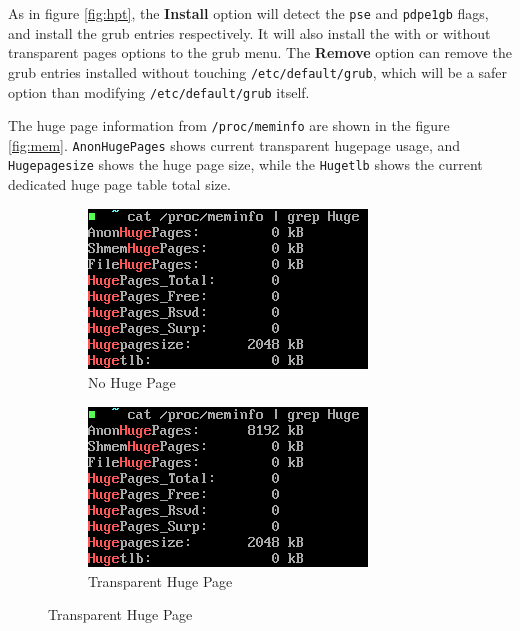 \documentclass[12pt]{article}
\begin{document}
As in figure \ref{fig:hpt}, the \textbf{Install} option will detect the \texttt{pse} and \texttt{pdpe1gb} flags, and install the grub entries respectively. It will also install the with or without transparent pages options to the grub menu. The \textbf{Remove} option can remove the grub entries installed without touching \texttt{/etc/default/grub}, which will be a safer option than modifying \texttt{/etc/default/grub} itself.

The huge page information from \texttt{/proc/meminfo} are shown in the figure \ref{fig:mem}. \texttt{AnonHugePages} shows current transparent hugepage usage, and \texttt{Hugepagesize} shows the huge page size, while the \texttt{Hugetlb} shows the current dedicated huge page table total size.

\begin{figure}[h]
	\centering
	\hfill
	\begin{subfigure}[b]{0.4\textwidth}
		\centering
		\includegraphics[width=\textwidth]{fig7-4.png}
		\caption{No Huge Page}
	\end{subfigure}
	\hfill
	\begin{subfigure}[b]{0.4\textwidth}
		\centering
		\includegraphics[width=\textwidth]{fig7-3.png}
		\caption{Transparent Huge Page}
	\end{subfigure}
	\hfill


\end{figure}
\end{document}
